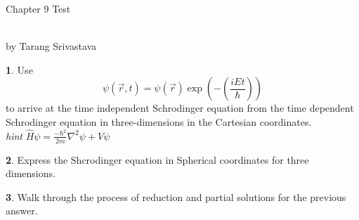 \documentclass[10pt, twocolumn]{article}
\author{Tarang Srivastava}
\newcommand{\makechaptertitle}[1]{
\begin{center}
	\begin{large}
		#1
	\end{large}
	\begin{small}
		\\by Tarang Srivastava
	\end{small}
\end{center}
}
\theoremstyle{definition}
\newtheorem{q}{}
\begin{document}
	\makechaptertitle{Chapter 9 Test}
	\begin{q}
		Use
		\[ \psi(\vec{r}, t) = \psi(\vec{r}) \exp (-\left(\frac{iEt}{\hbar}\right)) \]
		to arrive at the time independent Schrodinger equation from the time dependent Schrodinger equation in three-dimensions in the Cartesian coordinates. \\
		\textit{hint} $ \hat{H} \psi = \frac{-\hbar^2}{2m} \nabla^2 \psi + V \psi  $
	\end{q}
	\begin{q}
		Express the Shcrodinger equation in Spherical coordinates for three dimensions.
	\end{q}
	\begin{q}
		Walk through the process of reduction and partial solutions for the previous answer. 
	\end{q}
\end{document}
